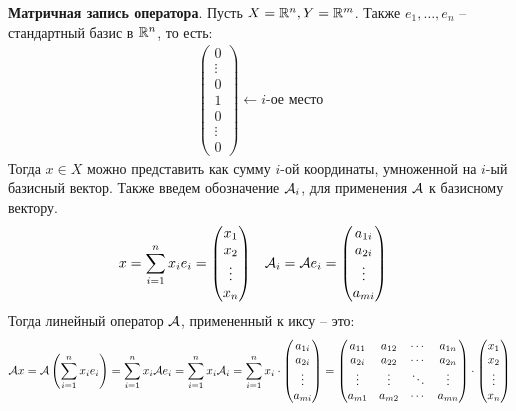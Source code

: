 \textbf{Матричная запись оператора}. Пусть $X = \mathbb{R}^n, Y = \mathbb{R}^m$. Также $e_1, \dots, e_n$ -- стандартный базис в $\mathbb{R}^n$, то есть:
\begin{gather*}
    \begin{pmatrix*}
        0 \\ 
        \vdots \\
        0 \\
        1 \\
        0 \\
        \vdots \\
        0
    \end{pmatrix*} \longleftarrow i\text{-ое место}
\end{gather*}
Тогда $x \in X$ можно представить как сумму $i$-ой координаты, умноженной на $i$-ый базисный вектор. 
Также введем обозначение $\mathcal{A}_i$, для применения $\mathcal{A}$ к базисному вектору. 
\begin{align*}
    x &= \sum\limits_{i=1}^n x_i e_i = \begin{pmatrix*}
        x_1 \\
        x_2 \\
        \vdots \\
        x_n
    \end{pmatrix*} & \A_i &= \A e_i = \begin{pmatrix*}
        a_{1i} \\
        a_{2i} \\
        \vdots \\
        a_{mi}
    \end{pmatrix*}
\end{align*}
Тогда линейный оператор $\mathcal{A}$, примененный к иксу -- это:
\begin{gather*}
    \A x = \A \left( \sum\limits_{i=1}^n x_i e_i \right) = \sum\limits_{i=1}^n x_i \A e_i = \sum\limits_{i=1}^n x_i \A_i = \sum\limits_{i=1}^n x_i \cdot \begin{pmatrix*} 
        a_{1i} \\
        a_{2i} \\
        \vdots \\
        a_{mi}
    \end{pmatrix*} =
    \begin{pmatrix*} 
        a_{11} & a_{12} & \cdots & a_{1n} \\
        a_{2i} & a_{22} & \cdots & a_{2n} \\
        \vdots & \vdots & \ddots & \vdots \\
        a_{m1} & a_{m2} & \cdots & a_{mn} 
    \end{pmatrix*} \cdot \begin{pmatrix*}
        x_1 \\
        x_2 \\
        \vdots \\
        x_n
    \end{pmatrix*}
\end{gather*}